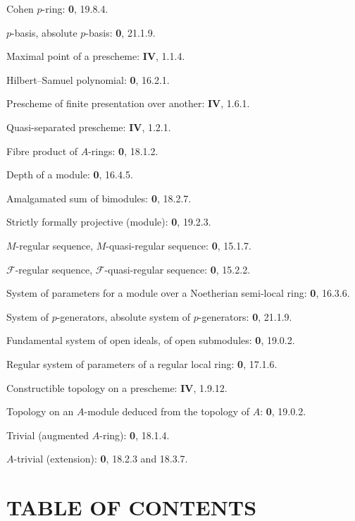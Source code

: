 Cohen $p$-ring: \textbf{0}, 19.8.4.\par
$p$-basis, absolute $p$-basis: \textbf{0}, 21.1.9.\par
Maximal point of a prescheme: \textbf{IV}, 1.1.4.\par

\clearpage
{}
Hilbert--Samuel polynomial: \textbf{0}, 16.2.1.\par
Prescheme of finite presentation over another: \textbf{IV}, 1.6.1.\par
Quasi-separated prescheme: \textbf{IV}, 1.2.1.\par
Fibre product of $A$-rings: \textbf{0}, 18.1.2.\par
Depth of a module: \textbf{0}, 16.4.5.\par

Amalgamated sum of bimodules: \textbf{0}, 18.2.7.\par
Strictly formally projective (module): \textbf{0}, 19.2.3.\par
$M$-regular sequence, $M$-quasi-regular sequence: \textbf{0}, 15.1.7.\par
$\mathscr F$-regular sequence, $\mathscr F$-quasi-regular sequence: \textbf{0}, 15.2.2.\par
System of parameters for a module over a Noetherian semi-local ring: \textbf{0}, 16.3.6.\par
System of $p$-generators, absolute system of $p$-generators: \textbf{0}, 21.1.9.\par
Fundamental system of open ideals, of open submodules: \textbf{0}, 19.0.2.\par
Regular system of parameters of a regular local ring: \textbf{0}, 17.1.6.\par

Constructible topology on a prescheme: \textbf{IV}, 1.9.12.\par
Topology on an $A$-module deduced from the topology of $A$: \textbf{0}, 19.0.2.\par
Trivial (augmented $A$-ring): \textbf{0}, 18.1.4.\par
$A$-trivial (extension): \textbf{0}, 18.2.3 and 18.3.7.\par

\clearpage
{}
{}

\section*{TABLE OF CONTENTS}

